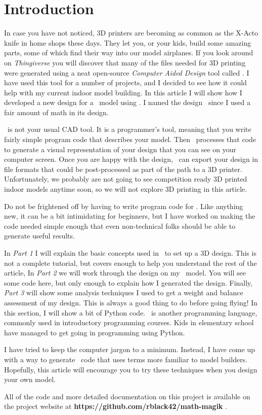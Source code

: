 \section{Introduction}

In case you have not noticed, 3D printers are becoming as common as the X-Acto
knife in home shops these days. They let you, or your kids, build some amazing
parts, some of which find their way into our model airplanes. If you look
around on {\it Thingiverse} \cite{thingy} you will discover that many of the
files needed for 3D printing were generated using a neat open-source {\it
Computer Aided Design} tool called \osc. I have used this tool for a number of
projects, and I decided to see how it could help with my current indoor model
building. In this article I will show how I developed a new design for a \LPP\ model
using \osc. I named the design \MM\ since I used a fair amount of math in its
design.

\osc\ is not your usual CAD tool. It is a programmer's tool, meaning that you
write fairly simple program code that describes your model. Then \osc\ processes
that code to generate a visual representation of your design that you can see on
your computer screen. Once you are happy with the design, \osc\ can export your
design in file formats that could be post-processed as part of the path to a 3D
printer. Unfortunately, we probably are not going to see competition ready 3D
printed indoor models anytime soon, so we will not explore 3D printing in this
article.

Do not be frightened off by having to write program code for \osc. Like
anything new, it can be a bit intimidating for beginners, but I have worked on
making the code needed simple enough that even non-technical folks should be
able to generate useful results.

In {\it Part 1} I will explain the basic concepts used in \osc\ to
set up a 3D design. This is not a complete tutorial, but covers enough to help
you understand the rest of the article, In {\it Part 2} we will work through
the design on my \LPP\ model. You will see some code here, but only enough to
explain how I generated the design. Finally, {\it Part 3} will show some
analysis techniques I used to get a weight and balance assessment of my design.
This is always a good thing to do before going flying! In this section, I will
show a bit of Python code. \PY\ is another programming language, commonly
used in introductory programming courses. Kids in elementary school have
managed to get going in programming using Python.

I have tried to keep the computer jargon to a minimum. Instead, I have come up with
a way to generate \osc\ code that uses terms more familiar to model builders.
Hopefully, this article will encourage you to try these techniques when you
design your own model.

All of the code and more detailed documentation on this project is available on
the project website at {\bf https://github.com/rblack42/math-magik}
\cite{blackr}.


